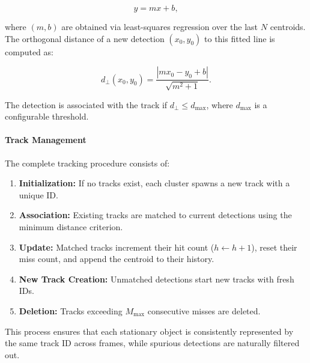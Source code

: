 \begin{equation}
    y = m x + b,
\end{equation}

where $(m,b)$ are obtained via least-squares regression over the last $N$ centroids.  
The orthogonal distance of a new detection $(x_0, y_0)$ to this fitted line is computed as:

\begin{equation}
    d_{\perp}(x_0, y_0) = \frac{|m x_0 - y_0 + b|}{\sqrt{m^2 + 1}}.
\end{equation}

The detection is associated with the track if $d_{\perp} \leq d_{\text{max}}$, where $d_{\text{max}}$ is a configurable threshold.

\paragraph{Track Management}
The complete tracking procedure consists of:
\begin{enumerate}
    \item \textbf{Initialization:} If no tracks exist, each cluster spawns a new track with a unique ID.
    \item \textbf{Association:} Existing tracks are matched to current detections using the minimum distance criterion.
    \item \textbf{Update:} Matched tracks increment their hit count ($h \leftarrow h+1$), reset their miss count, and append the centroid to their history.
    \item \textbf{New Track Creation:} Unmatched detections start new tracks with fresh IDs.
    \item \textbf{Deletion:} Tracks exceeding $M_{\text{max}}$ consecutive misses are deleted.
\end{enumerate}

This process ensures that each stationary object is consistently represented by the same track ID across frames, while spurious detections are naturally filtered out.

